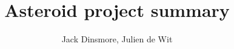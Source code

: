 \documentclass[11pt]{article}
\begin{document}
\title{Asteroid project summary}
\author{Jack Dinsmore, Julien de Wit}

\maketitle
\end{document}
